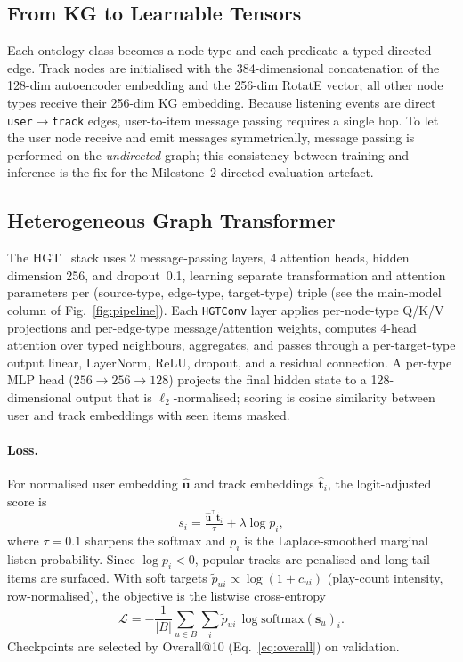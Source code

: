 \documentclass[10pt,twocolumn,letterpaper]{article}
\begin{document}
\subsection{From KG to Learnable Tensors}
Each ontology class becomes a node type and each predicate a typed directed edge.
Track nodes are initialised with the 384-dimensional concatenation of the 128-dim
autoencoder embedding and the 256-dim RotatE vector; all other node types receive
their 256-dim KG embedding. Because listening events are direct
\texttt{user}$\to$\texttt{track} edges, user-to-item message passing requires a
single hop. To let the user node receive and emit messages symmetrically, message
passing is performed on the \emph{undirected} graph; this consistency between
training and inference is the fix for the Milestone~2 directed-evaluation artefact.

\subsection{Heterogeneous Graph Transformer}
The HGT~\cite{hu2020hgt} stack uses 2 message-passing layers, 4 attention heads,
hidden dimension 256, and dropout~0.1, learning separate transformation and
attention parameters per (source-type, edge-type, target-type) triple
(see the main-model column of Fig.~\ref{fig:pipeline}). Each \texttt{HGTConv} layer
applies per-node-type Q/K/V projections and per-edge-type message/attention
weights, computes 4-head attention over typed neighbours, aggregates, and passes
through a per-target-type output linear, LayerNorm, ReLU, dropout, and a residual
connection. A per-type MLP head ($256\!\to\!256\!\to\!128$) projects the final
hidden state to a 128-dimensional output that is $\ell_2$-normalised; scoring is
cosine similarity between user and track embeddings with seen items masked.

\paragraph{Loss.} For normalised user embedding $\hat{\mathbf{u}}$ and track
embeddings $\hat{\mathbf{t}}_i$, the logit-adjusted score is
\begin{equation}
  s_i = \tfrac{\hat{\mathbf{u}}^\top\hat{\mathbf{t}}_i}{\tau} + \lambda\log p_i,
\end{equation}
where $\tau{=}0.1$ sharpens the softmax and $p_i$ is the Laplace-smoothed marginal
listen probability. Since $\log p_i<0$, popular tracks are penalised and long-tail
items are surfaced. With soft targets $\tilde{p}_{ui}\propto\log(1+c_{ui})$
(play-count intensity, row-normalised), the objective is the listwise
cross-entropy
\begin{equation}
  \mathcal{L}=-\frac{1}{|B|}\sum_{u\in B}\sum_i
  \tilde{p}_{ui}\,\log\mathrm{softmax}(\mathbf{s}_u)_i .
\end{equation}
Checkpoints are selected by Overall@10 (Eq.~\ref{eq:overall}) on validation.
\end{document}

